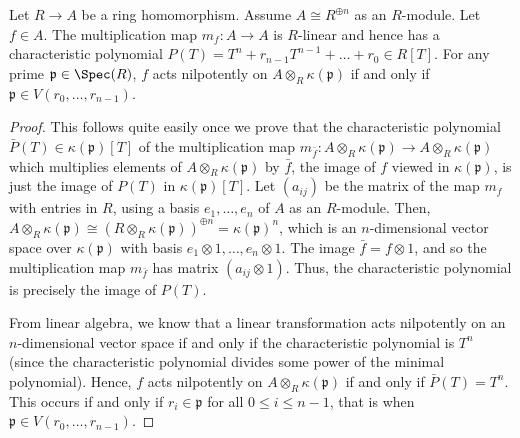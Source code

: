 \begin{lemma}
\label{lemma-characteristic-polynomial-prime}
Let $R \to A$ be a ring homomorphism.
Assume $A \cong R^{\oplus n}$ as an $R$-module.
Let $f \in A$. The multiplication map $m_f: A
\to A$ is $R$-linear and hence
has a characteristic polynomial
$P(T) = T^n + r_{n-1}T^{n-1} + \ldots + r_0 \in R[T]$.
For any prime
$\mathfrak{p} \in \Spec(R)$, $f$ acts nilpotently on $A
\otimes_R \kappa(\mathfrak{p})$ if and only if $\mathfrak p \in
V(r_0, \ldots, r_{n-1})$.
\end{lemma}

\begin{proof}
This follows quite easily once we prove that the characteristic
polynomial $\bar P(T) \in \kappa(\mathfrak p)[T]$ of the
multiplication map $m_{\bar f}: A \otimes_R \kappa(\mathfrak p) \to
A \otimes_R \kappa(\mathfrak p)$ which multiplies elements of $A
\otimes_R \kappa(\mathfrak p)$ by $\bar f$, the image of $f$ viewed in
$\kappa(\mathfrak p)$, is just the image of $P(T)$ in
$\kappa(\mathfrak p)[T]$. Let $(a_{ij})$ be the matrix of the map
$m_f$ with entries in $R$, using a basis $e_1, \ldots, e_n$
of $A$ as an $R$-module.
Then, $A \otimes_R \kappa(\mathfrak p) \cong (R \otimes_R
\kappa(\mathfrak p))^{\oplus n} = \kappa(\mathfrak p)^n$, which is
an $n$-dimensional vector space over $\kappa(\mathfrak p)$ with
basis $e_1 \otimes 1, \ldots, e_n \otimes 1$. The image $\bar f = f
\otimes 1$, and so the multiplication map $m_{\bar f}$ has matrix
$(a_{ij} \otimes 1)$. Thus, the characteristic polynomial is
precisely the image of $P(T)$.

\medskip\noindent
From linear algebra, we know that a linear transformation acts
nilpotently on an $n$-dimensional vector space if and only if the
characteristic polynomial is $T^n$ (since the characteristic
polynomial divides some power of the minimal polynomial). Hence,
$f$ acts nilpotently on $A \otimes_R \kappa(\mathfrak p)$ if and
only if $\bar P(T) = T^n$. This occurs if and only if $r_i \in
\mathfrak p$ for all $0 \leq i \leq n - 1$, that is when $\mathfrak p \in
V(r_0, \ldots, r_{n - 1}).$
\end{proof}